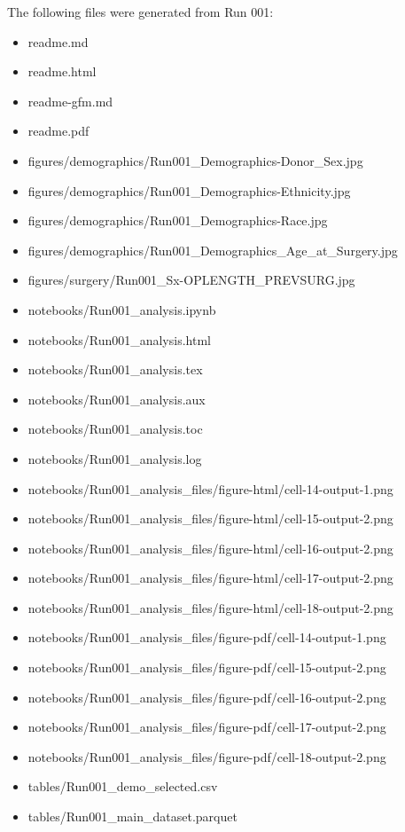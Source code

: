\documentclass[
  letterpaper,
  DIV=11,
  numbers=noendperiod]{scrartcl}
\providecommand{\tightlist}{%
  \setlength{\itemsep}{0pt}\setlength{\parskip}{0pt}}\usepackage{longtable,booktabs,array}
\begin{document}
The following files were generated from Run 001:

\begin{itemize}
\tightlist
\item
  readme.md
\item
  readme.html
\item
  readme-gfm.md
\item
  readme.pdf
\item
  figures/demographics/Run001\_Demographics-Donor\_Sex.jpg
\item
  figures/demographics/Run001\_Demographics-Ethnicity.jpg
\item
  figures/demographics/Run001\_Demographics-Race.jpg
\item
  figures/demographics/Run001\_Demographics\_Age\_at\_Surgery.jpg
\item
  figures/surgery/Run001\_Sx-OPLENGTH\_PREVSURG.jpg
\item
  notebooks/Run001\_analysis.ipynb
\item
  notebooks/Run001\_analysis.html
\item
  notebooks/Run001\_analysis.tex
\item
  notebooks/Run001\_analysis.aux
\item
  notebooks/Run001\_analysis.toc
\item
  notebooks/Run001\_analysis.log
\item
  notebooks/Run001\_analysis\_files/figure-html/cell-14-output-1.png
\item
  notebooks/Run001\_analysis\_files/figure-html/cell-15-output-2.png
\item
  notebooks/Run001\_analysis\_files/figure-html/cell-16-output-2.png
\item
  notebooks/Run001\_analysis\_files/figure-html/cell-17-output-2.png
\item
  notebooks/Run001\_analysis\_files/figure-html/cell-18-output-2.png
\item
  notebooks/Run001\_analysis\_files/figure-pdf/cell-14-output-1.png
\item
  notebooks/Run001\_analysis\_files/figure-pdf/cell-15-output-2.png
\item
  notebooks/Run001\_analysis\_files/figure-pdf/cell-16-output-2.png
\item
  notebooks/Run001\_analysis\_files/figure-pdf/cell-17-output-2.png
\item
  notebooks/Run001\_analysis\_files/figure-pdf/cell-18-output-2.png
\item
  tables/Run001\_demo\_selected.csv
\item
  tables/Run001\_main\_dataset.parquet
\end{itemize}
\end{document}
